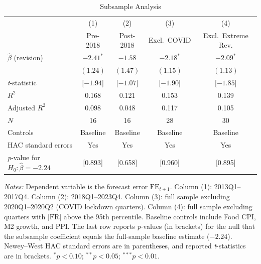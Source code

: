 \begin{table}[!htbp]
\centering
\begin{threeparttable}
\caption{Subsample Analysis}
\label{tab:subsample}
\begin{tabular}{lcccc}
\toprule
 & (1) & (2) & (3) & (4) \\
 & Pre-2018 & Post-2018 & Excl.\ COVID & Excl.\ Extreme Rev. \\
\midrule
$\hat{\beta}$ (revision) & $-2.41^{*}$ & $-1.58$ & $-2.18^{*}$ & $-2.09^{*}$ \\
 & $(1.24)$ & $(1.47)$ & $(1.15)$ & $(1.13)$ \\
\addlinespace
\textit{t}-statistic & [$-1.94$] & [$-1.07$] & [$-1.90$] & [$-1.85$] \\
\addlinespace
$R^2$ & 0.168 & 0.121 & 0.153 & 0.139 \\
Adjusted $R^2$ & 0.098 & 0.048 & 0.117 & 0.105 \\
$N$ & 16 & 16 & 28 & 30 \\
\midrule
Controls & Baseline & Baseline & Baseline & Baseline \\
HAC standard errors & Yes & Yes & Yes & Yes \\
\addlinespace
\textit{p}-value for $H_0:\hat{\beta}=-2.24$ & [0.893] & [0.658] & [0.960] & [0.895] \\
\bottomrule
\end{tabular}
\begin{tablenotes}[flushleft]
\footnotesize
\item \textit{Notes:} Dependent variable is the forecast error $\text{FE}_{t+1}$. Column (1): 2013Q1--2017Q4. Column (2): 2018Q1--2023Q4. Column (3): full sample excluding 2020Q1--2020Q2 (COVID lockdown quarters). Column (4): full sample excluding quarters with $|\text{FR}|$ above the 95th percentile. Baseline controls include Food CPI, M2 growth, and PPI. The last row reports \textit{p}-values (in brackets) for the null that the subsample coefficient equals the full-sample baseline estimate ($-2.24$). Newey--West HAC standard errors are in parentheses, and reported \textit{t}-statistics are in brackets. $^{*}p<0.10$; $^{**}p<0.05$; $^{***}p<0.01$.
\end{tablenotes}
\end{threeparttable}
\end{table}
